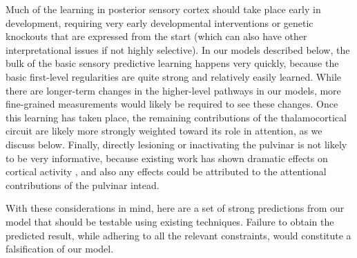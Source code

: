 \documentclass[11pt,twoside]{article}
\newif\myifpdf
\begin{document}
Much of the learning in posterior sensory cortex should take place early in development, requiring very early developmental interventions or genetic knockouts that are expressed from the start (which can also have other interpretational issues if not highly selective).  In our models described below, the bulk of the basic sensory predictive learning happens very quickly, because the basic first-level regularities are quite strong and relatively easily learned.  While there are longer-term changes in the higher-level pathways in our models, more fine-grained measurements would likely be required to see these changes.  Once this learning has taken place, the remaining contributions of the thalamocortical circuit are likely more strongly weighted toward its role in attention, as we discuss below.  Finally, directly lesioning or inactivating the pulvinar is not likely to be very informative, because existing work has shown dramatic effects on cortical activity \citep{ZhouSchaferDesimone16,PurushothamanMarionLiEtAl12}, and also any effects could be attributed to the attentional contributions of the pulvinar intead.

With these considerations in mind, here are a set of strong predictions from our model that should be testable using existing techniques.  Failure to obtain the predicted result, while adhering to all the relevant constraints, would constitute a falsification of our model.
\end{document}
